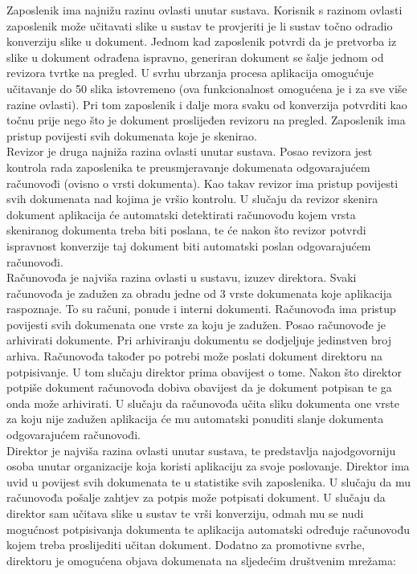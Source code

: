 	Zaposlenik ima najnižu razinu ovlasti unutar sustava. Korisnik s razinom ovlasti zaposlenik može učitavati slike u sustav te provjeriti je li sustav točno odradio konverziju slike u dokument. Jednom kad zaposlenik potvrdi da je pretvorba iz slike u dokument odrađena ispravno, generiran dokument se šalje jednom od revizora tvrtke na pregled. U svrhu ubrzanja procesa aplikacija omogućuje učitavanje do 50 slika istovremeno (ova funkcionalnost omogućena je i za sve više razine ovlasti). Pri tom zaposlenik i dalje mora svaku od konverzija potvrditi kao točnu prije nego što je dokument proslijeđen revizoru na pregled. Zaposlenik ima pristup povijesti svih dokumenata koje je skenirao.\\
	
	Revizor je druga najniža razina ovlasti unutar sustava. Posao revizora jest kontrola rada zaposlenika te preusmjeravanje dokumenata odgovarajućem računovođi (ovisno o vrsti dokumenta). Kao takav revizor ima pristup povijesti svih dokumenata nad kojima je vršio kontrolu. U slučaju da revizor skenira dokument aplikacija će automatski detektirati računovođu kojem vrsta skeniranog dokumenta treba biti poslana, te će nakon što revizor potvrdi ispravnost konverzije taj dokument biti automatski poslan odgovarajućem računovođi.\\
	
	
	Računovođa je najviša razina ovlasti u sustavu, izuzev direktora. Svaki računovođa je zadužen za obradu jedne od 3 vrste dokumenata koje aplikacija raspoznaje. To su računi, ponude i interni dokumenti. Računovođa ima pristup povijesti svih dokumenata one vrste za koju je zadužen. Posao računovođe je arhivirati dokumente. Pri arhiviranju dokumentu se dodjeljuje jedinstven broj arhiva. Računovođa također po potrebi može poslati dokument direktoru na potpisivanje. U tom slučaju direktor prima obavijest o tome. Nakon što direktor potpiše dokument računovođa dobiva obavijest da je dokument potpisan te ga onda može arhivirati. U slučaju da računovođa učita sliku dokumenta one vrste za koju nije zadužen aplikacija će mu automatski ponuditi slanje dokumenta odgovarajućem računovođi.\\
	
	Direktor je najviša razina ovlasti unutar sustava, te predstavlja najodgovorniju osoba unutar organizacije koja koristi aplikaciju za svoje poslovanje. Direktor ima uvid u povijest svih dokumenata te u statistike svih zaposlenika. U slučaju da mu računovođa pošalje zahtjev za potpis može potpisati dokument. U slučaju da direktor sam učitava slike u sustav te vrši konverziju, odmah mu se nudi mogućnost potpisivanja dokumenta te aplikacija automatski određuje računovođu kojem treba proslijediti učitan dokument. Dodatno za promotivne svrhe, direktoru je omogućena objava dokumenata na sljedećim društvenim mrežama: 
	
